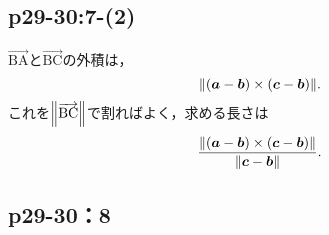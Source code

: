 \documentclass[uplatex,dvipdfmx,a4paper,11pt,fleqn]{jsarticle}
\begin{document}
\subsection*{p29-30:7-(2)}

\begin{tleftbar}
    $ \overrightarrow{\mathrm{BA}}$と$\overrightarrow{\mathrm{BC}}$の外積は，
    \[
    \norm{(\bm{a}-\bm{b})\times(\bm{c}-\bm{b})}.
    \]
    これを$\norm{\overrightarrow{\mathrm{BC}}}$で割ればよく，求める長さは
    \[
        \frac{\norm{(\bm{a}-\bm{b})\times(\bm{c}-\bm{b})}}{\norm{\bm{c}-\bm{b}}}.
    \]
\end{tleftbar}

\subsection*{p29-30：8}
\end{document}
